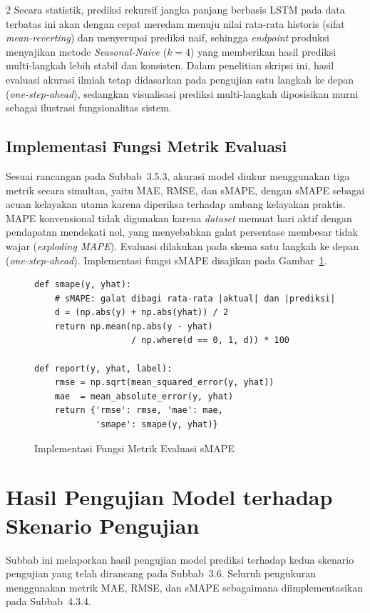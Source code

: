 \documentclass[12pt, a4paper, onecolumn, oneside]{report}
\begin{document}
\begin{spacing}{2}
Secara statistik, prediksi rekursif jangka panjang berbasis LSTM pada data terbatas ini akan dengan cepat meredam menuju nilai rata-rata historis (sifat \textit{mean-reverting}) dan menyerupai prediksi naif, sehingga \textit{endpoint} produksi menyajikan metode \textit{Seasonal-Naive} ($k=4$) yang memberikan hasil prediksi multi-langkah lebih stabil dan konsisten. Dalam penelitian skripsi ini, hasil evaluasi akurasi ilmiah tetap didasarkan pada pengujian satu langkah ke depan (\textit{one-step-ahead}), sedangkan visualisasi prediksi multi-langkah diposisikan murni sebagai ilustrasi fungsionalitas sistem.

\subsection{Implementasi Fungsi Metrik Evaluasi}
Sesuai rancangan pada Subbab~3.5.3, akurasi model diukur menggunakan tiga metrik secara simultan, yaitu MAE, RMSE, dan sMAPE, dengan sMAPE sebagai acuan kelayakan utama karena diperiksa terhadap ambang kelayakan praktis. MAPE konvensional tidak digunakan karena \textit{dataset} memuat hari aktif dengan pendapatan mendekati nol, yang menyebabkan galat persentase membesar tidak wajar (\textit{exploding MAPE}). Evaluasi dilakukan pada skema satu langkah ke depan (\textit{one-step-ahead}). Implementasi fungsi sMAPE disajikan pada Gambar~\ref{fig:metrics}.

\begin{figure}[H]
\begin{lstlisting}
def smape(y, yhat):
    # sMAPE: galat dibagi rata-rata |aktual| dan |prediksi|
    d = (np.abs(y) + np.abs(yhat)) / 2
    return np.mean(np.abs(y - yhat)
                   / np.where(d == 0, 1, d)) * 100

def report(y, yhat, label):
    rmse = np.sqrt(mean_squared_error(y, yhat))
    mae  = mean_absolute_error(y, yhat)
    return {'rmse': rmse, 'mae': mae,
            'smape': smape(y, yhat)}
\end{lstlisting}
\caption{Implementasi Fungsi Metrik Evaluasi sMAPE}
\label{fig:metrics}
\end{figure}

\section{Hasil Pengujian Model terhadap Skenario Pengujian}
Subbab ini melaporkan hasil pengujian model prediksi terhadap kedua skenario pengujian yang telah dirancang pada Subbab~3.6. Seluruh pengukuran menggunakan metrik MAE, RMSE, dan sMAPE sebagaimana diimplementasikan pada Subbab~4.3.4.

\end{spacing}
\end{document}

